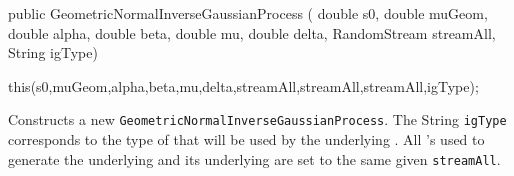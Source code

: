 \begin{code}

   public GeometricNormalInverseGaussianProcess (
                                        double s0, double muGeom,
                                        double alpha, double beta,
                                        double mu, double delta,
                                        RandomStream streamAll,
                                        String igType) \begin{hide} {
        this(s0,muGeom,alpha,beta,mu,delta,streamAll,streamAll,streamAll,igType);
    }\end{hide}
\end{code}
\begin{tabb} Constructs a new \texttt{GeometricNormalInverseGaussianProcess}.
The String \texttt{igType} corresponds to the type of 
that will be used by the underlying .
All 's used to generate the underlying
 and its underlying 
are set to the same given \texttt{streamAll}.
\end{tabb}
\begin{code}
\begin{hide}
}
\end{hide}
\end{code}
